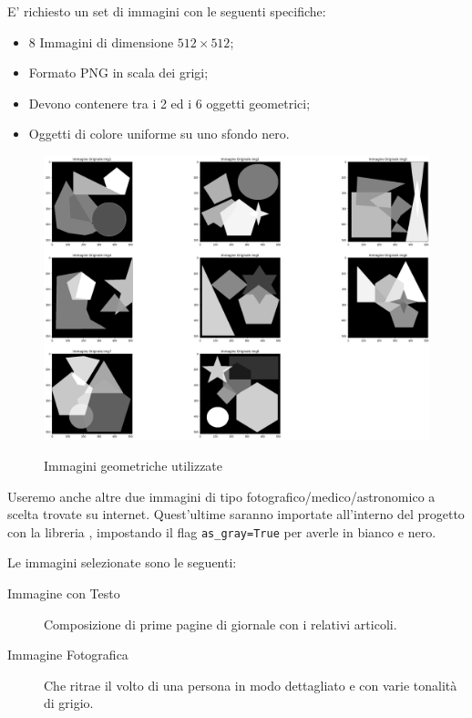 E' richiesto un set di immagini con le seguenti specifiche: 
\begin{itemize}
    \item 8 Immagini di dimensione $512 \times 512$;
    \item Formato PNG in scala dei grigi;
    \item Devono contenere tra i 2 ed i 6 oggetti geometrici;
    \item Oggetti di colore uniforme su uno sfondo nero.
\end{itemize}
\begin{figure}[h]
    \centering
    \includegraphics[width=0.5\linewidth]{./imgRel/dataset.png}\label{fig:datasetgeometriche}
    \caption{Immagini geometriche utilizzate}
\end{figure}
Useremo anche altre due immagini di tipo fotografico/medico/astronomico a scelta trovate su internet.
Quest'ultime saranno importate all'interno del progetto con la libreria , impostando il flag \verb|as_gray=True| per averle in bianco e nero.

Le immagini selezionate sono le seguenti:
\begin{description}
    \item[Immagine con Testo] Composizione di prime pagine di giornale con i relativi articoli.
    \item[Immagine Fotografica] Che ritrae il volto di una persona in modo dettagliato e con varie tonalità di grigio.
\end{description}


